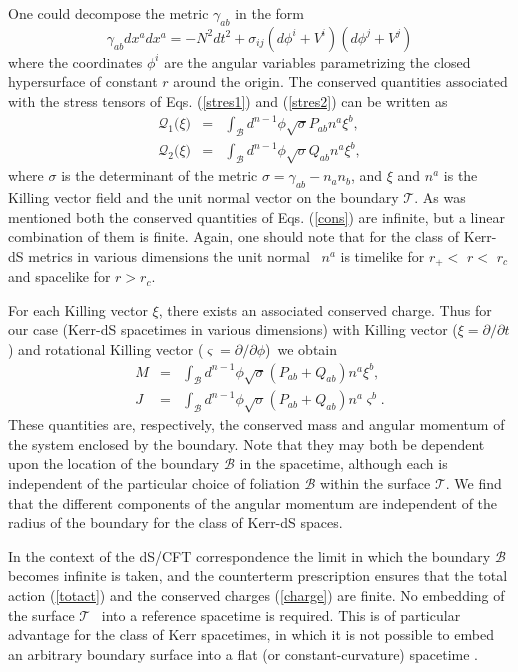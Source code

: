 \documentclass[a4paper,12pt,onecolumn]{revtex4}
\begin{document}
One could decompose the metric $\gamma _{ab}$ in the form
\begin{equation}
\gamma _{ab}dx^adx^a=-N^2dt^2+\sigma _{ij}\left( d\phi ^i+V^i\right) \left(
d\phi ^j+V^j\right)   \label{gam}
\end{equation}
where the coordinates $\phi ^i$ are the angular variables
parametrizing the closed hypersurface of constant $r$ around the
origin. The conserved quantities associated with the stress
tensors of Eqs. (\ref{stres1}) and (\ref {stres2}) can be written
as
\begin{eqnarray}
\mathcal{Q}_1(\mathcal{\xi )} &=&\int_{\mathcal{B}}d^{n-1}\phi \sqrt{\sigma }%
P_{ab}n^a\mathcal{\xi }^b,  \nonumber \\
\mathcal{Q}_2(\mathcal{\xi )} &=&\int_{\mathcal{B}}d^{n-1}\phi \sqrt{\sigma }%
Q_{ab}n^a\mathcal{\xi }^b,  \label{cons}
\end{eqnarray}
where $\sigma $ is the determinant of the metric $\sigma =\gamma
_{ab}-n_an_b $, and $\mathcal{\xi}$ and $n^a$ is the Killing
vector field and the unit normal vector on the boundary
$\mathcal{T}$. As was mentioned both the conserved quantities of
Eqs. (\ref{cons}) are infinite, but a linear combination of them
is finite. Again, one should note that for the class of Kerr-dS
metrics in various dimensions the unit normal \ $n^a$ is timelike
for $r_{+}<$ $r<$ $r_c$ and spacelike for $r>r_c$.

For each Killing vector $\mathcal{\xi }$, there exists an
associated conserved charge. Thus for our case (Kerr-dS spacetimes
in various dimensions) with Killing vector ($\xi =\partial
/\partial t$) and rotational Killing vector ($\varsigma =\partial
/\partial \phi $)\ we obtain
\begin{eqnarray}
M &=&\int_{\mathcal{B}}d^{n-1}\phi \sqrt{\sigma
}(P_{ab}+Q_{ab})n^a\xi ^b,
\nonumber \\
J &=&\int_{\mathcal{B}}d^{n-1}\phi \sqrt{\sigma
}(P_{ab}+Q_{ab})n^a\varsigma ^b.  \label{charge}
\end{eqnarray}
These quantities are, respectively, the conserved mass and angular
momentum of the system enclosed by the boundary. Note that they
may both be dependent upon the location of the boundary
$\mathcal{B}$ in the spacetime, although each is independent of
the particular choice of foliation $\mathcal{B}$ within the
surface $\mathcal{T}$. We find that the different components of
the angular momentum are independent of the radius of the boundary
for the class of Kerr-dS spaces.

In the context of the dS/CFT correspondence the limit in which the boundary $%
\mathcal{B}$ becomes infinite is taken, and the counterterm
prescription ensures that the total action (\ref{totact}) and the
conserved charges (\ref {charge}) are finite. No embedding of the
surface $\mathcal{T}$ \ into a reference spacetime is required.
This is of particular advantage for the class of Kerr spacetimes,
in which it is not possible to embed an arbitrary boundary surface
into a flat (or constant-curvature) spacetime \cite
{Martinez,Deh1}.
\end{document}
